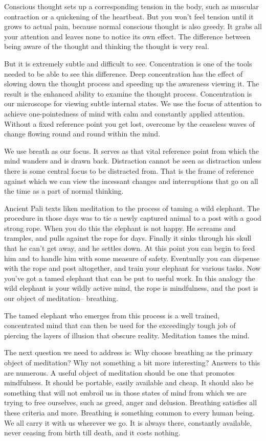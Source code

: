 Conscious thought sets up a corresponding tension in the body, such as muscular
contraction or a quickening of the heartbeat. But you won't feel tension until
it grows to actual pain, because normal conscious thought is also greedy. It
grabs all your attention and leaves none to notice its own effect. The
difference between being aware of the thought and thinking the thought is very
real.

But it is extremely subtle and difficult to see. Concentration is one of the
tools needed to be able to see this difference.  Deep concentration has the
effect of slowing down the thought process and speeding up the awareness viewing
it. The result is the enhanced ability to examine the thought process.
Concentration is our microscope for viewing subtle internal states. We use the
focus of attention to achieve one-pointedness of mind with calm and constantly
applied attention. Without a fixed reference point you get lost, overcome by the
ceaseless waves of change flowing round and round within the mind.

We use breath as our focus. It serves as that vital reference point from which
the mind wanders and is drawn back. Distraction cannot be seen as distraction
unless there is some central focus to be distracted from. That is the frame of
reference against which we can view the incessant changes and interruptions that
go on all the time as a part of normal thinking.

Ancient Pali texts liken meditation to the process of taming a wild elephant.
The procedure in those days was to tie a newly captured animal to a post with a
good strong rope. When you do this the elephant is not happy. He screams and
tramples, and pulls against the rope for days. Finally it sinks through his
skull that he can't get away, and he settles down. At this point you can begin
to feed him and to handle him with some measure of safety. Eventually you can
dispense with the rope and post altogether, and train your elephant for various
tasks. Now you've got a tamed elephant that can be put to useful work. In this
analogy the wild elephant is your wildly active mind, the rope is mindfulness,
and the post is our object of meditation-- breathing.

The tamed elephant who emerges from this process is a well trained, concentrated
mind that can then be used for the exceedingly tough job of piercing the layers
of illusion that obscure reality. Meditation tames the mind.

The next question we need to address is: Why choose breathing as the primary
object of meditation? Why not something a bit more interesting? Answers to this
are numerous. A useful object of meditation should be one that promotes
mindfulness. It should be portable, easily available and cheap. It should also
be something that will not embroil us in those states of mind from which we are
trying to free ourselves, such as greed, anger and delusion. Breathing satisfies
all these criteria and more. Breathing is something common to every human being.
We all carry it with us wherever we go. It is always there, constantly
available, never ceasing from birth till death, and it costs nothing.


